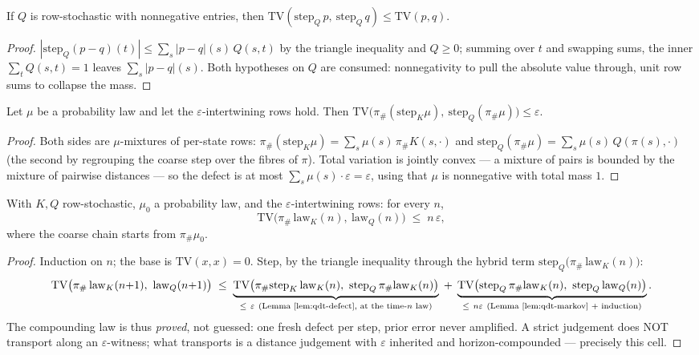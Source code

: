 \begin{blemma}\label{lem:qdt-markov}
If $Q$ is row-stochastic with nonnegative entries, then
$\mathrm{TV}(\mathrm{step}_Q\, p,\ \mathrm{step}_Q\, q) \leq
\mathrm{TV}(p, q)$.
\end{blemma}
\begin{proof}
$|\mathrm{step}_Q(p - q)(t)| \leq \sum_s |p - q|(s)\, Q(s, t)$ by the
triangle inequality and $Q \geq 0$; summing over $t$ and swapping sums,
the inner $\sum_t Q(s, t) = 1$ leaves $\sum_s |p - q|(s)$. Both
hypotheses on $Q$ are consumed: nonnegativity to pull the absolute
value through, unit row sums to collapse the mass.
\end{proof}

\begin{blemma}\label{lem:qdt-defect}
Let $\mu$ be a probability law and let the $\varepsilon$-intertwining
rows hold. Then
$\mathrm{TV}\bigl(\pi_{\#}(\mathrm{step}_K \mu),\
\mathrm{step}_Q(\pi_{\#}\mu)\bigr) \leq \varepsilon$.
\end{blemma}
\begin{proof}
Both sides are $\mu$-mixtures of per-state rows:
$\pi_{\#}(\mathrm{step}_K \mu) = \sum_s \mu(s)\,
\pi_{\#}K(s, \cdot)$ and $\mathrm{step}_Q(\pi_{\#}\mu) =
\sum_s \mu(s)\, Q(\pi(s), \cdot)$ (the second by regrouping the coarse
step over the fibres of $\pi$). Total variation is jointly convex ---
a mixture of pairs is bounded by the mixture of pairwise distances ---
so the defect is at most $\sum_s \mu(s) \cdot \varepsilon =
\varepsilon$, using that $\mu$ is nonnegative with total mass $1$.
\end{proof}

\begin{bthm}
\label{thm:qdt-eps}
With $K, Q$ row-stochastic, $\mu_0$ a probability law, and the
$\varepsilon$-intertwining rows: for every $n$,
\[
\mathrm{TV}\bigl(\pi_{\#}\,\mathrm{law}_K(n),\ \mathrm{law}_Q(n)\bigr)
\;\leq\; n\, \varepsilon,
\]
where the coarse chain starts from $\pi_{\#}\mu_0$.
\end{bthm}
\begin{proof}
Induction on $n$; the base is $\mathrm{TV}(x, x) = 0$. Step, by the
triangle inequality through the hybrid term
$\mathrm{step}_Q\bigl(\pi_{\#}\,\mathrm{law}_K(n)\bigr)$:
\[
\mathrm{TV}\bigl(\pi_{\#}\,\mathrm{law}_K(n{+}1),\ \mathrm{law}_Q(n{+}1)\bigr)
\;\leq\;
\underbrace{\mathrm{TV}\bigl(\pi_{\#}\mathrm{step}_K\,\mathrm{law}_K(n),\
\mathrm{step}_Q\,\pi_{\#}\mathrm{law}_K(n)\bigr)}_{\leq\ \varepsilon
\ \text{(Lemma \ref{lem:qdt-defect}, at the time-}n\text{ law)}}
\;+\;
\underbrace{\mathrm{TV}\bigl(\mathrm{step}_Q\,\pi_{\#}\mathrm{law}_K(n),\
\mathrm{step}_Q\,\mathrm{law}_Q(n)\bigr)}_{\leq\ n \varepsilon
\ \text{(Lemma \ref{lem:qdt-markov} + induction)}} .
\]
The compounding law is thus \emph{proved}, not guessed: one fresh
defect per step, prior error never amplified. A strict judgement does
NOT transport along an $\varepsilon$-witness; what transports is a
distance judgement with $\varepsilon$ inherited and horizon-compounded
--- precisely this cell.
\end{proof}

